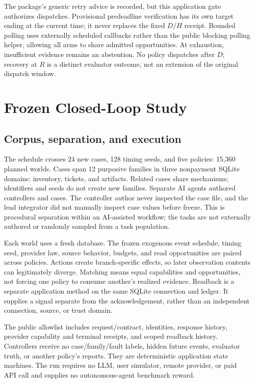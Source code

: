 \documentclass[conference]{IEEEtran}
\begin{document}
The package's generic retry advice is recorded, but this application gate authorizes dispatches. Provisional predeadline verification has its own target ending at the current time; it never replaces the fixed $D/H$ receipt. Bounded polling uses externally scheduled callbacks rather than the public blocking polling helper, allowing all arms to share admitted opportunities. At exhaustion, insufficient evidence remains an abstention. No policy dispatches after $D$; recovery at $R$ is a distinct evaluator outcome, not an extension of the original dispatch window.

\section{Frozen Closed-Loop Study}

\subsection{Corpus, separation, and execution}

The schedule crosses 24 new cases, 128 timing seeds, and five policies: 15,360 planned worlds. Cases span 12 purposive families in three nonpayment SQLite domains: inventory, tickets, and artifacts. Related cases share mechanisms; identifiers and seeds do not create new families. Separate AI agents authored controllers and cases. The controller author never inspected the case file, and the lead integrator did not manually inspect case values before freeze. This is procedural separation within an AI-assisted workflow; the tasks are not externally authored or randomly sampled from a task population.

Each world uses a fresh database. The frozen exogenous event schedule, timing seed, provider law, source behavior, budgets, and read opportunities are paired across policies. Actions create branch-specific effects, so later observation contents can legitimately diverge. Matching means equal capabilities and opportunities, not forcing one policy to consume another's realized evidence. Readback is a separate application method on the same SQLite connection and ledger. It supplies a signal separate from the acknowledgement, rather than an independent connection, source, or trust domain.

The public allowlist includes request/contract, identities, response history, provider capability and terminal receipts, and scoped readback history. Controllers receive no case/family/fault labels, hidden future events, evaluator truth, or another policy's reports. They are deterministic application state machines. The run requires no LLM, user simulator, remote provider, or paid API call and supplies no autonomous-agent benchmark reward.
\end{document}
